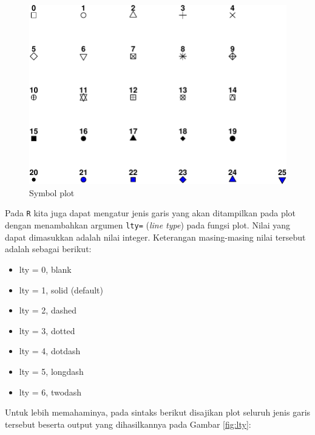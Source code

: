 \documentclass[]{book}
\providecommand{\tightlist}{%
  \setlength{\itemsep}{0pt}\setlength{\parskip}{0pt}}
\begin{document}
\begin{figure}

{\centering \includegraphics[width=0.7\linewidth]{EnvStat_files/figure-latex/symbol-1} 

}

\caption{Symbol plot}\label{fig:symbol}
\end{figure}

Pada \texttt{R} kita juga dapat mengatur jenis garis yang akan
ditampilkan pada plot dengan menambahkan argumen \texttt{lty=}
(\emph{line type}) pada fungsi plot. Nilai yang dapat dimasukkan adalah
nilai integer. Keterangan masing-masing nilai tersebut adalah sebagai
berikut:

\begin{itemize}
\tightlist
\item
  lty = 0, blank
\item
  lty = 1, solid (default)
\item
  lty = 2, dashed
\item
  lty = 3, dotted
\item
  lty = 4, dotdash
\item
  lty = 5, longdash
\item
  lty = 6, twodash
\end{itemize}

Untuk lebih memahaminya, pada sintaks berikut disajikan plot seluruh
jenis garis tersebut beserta output yang dihasilkannya pada Gambar
\ref{fig:lty}:
\end{document}
